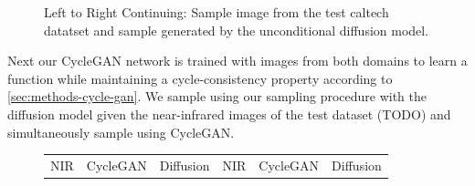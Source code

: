 \begin{figure}[htp!]
\begin{tabularx}{\textwidth}{>{\centering\arraybackslash}X >{\centering\arraybackslash}X >{\centering\arraybackslash}X >{\centering\arraybackslash}X >{\centering\arraybackslash}X >{\centering\arraybackslash}X}
    \end{tabularx}
    \caption{
        Left to Right Continuing: Sample image from the test caltech datatset \parencite{caltech} and sample generated by the unconditional diffusion model.
    }
    \label{fig:qualitative-evaluation-unconditional-sampling-caltech}
\end{figure}

Next our CycleGAN network is trained with images from both domains to learn a function while maintaining a cycle-consistency property according to \autoref{sec:methods-cycle-gan}.
We sample using our sampling procedure with the diffusion model given the near-infrared images of the test dataset (TODO) and simultaneously
sample using CycleGAN.

\begin{figure}[htp!]
    \centering
    \begin{tabularx}{\textwidth}{>{\centering\arraybackslash}X >{\centering\arraybackslash}X >{\centering\arraybackslash}X >{\centering\arraybackslash}X >{\centering\arraybackslash}X >{\centering\arraybackslash}X}
        NIR                                                                                                            & CycleGAN                                                                                                                 & Diffusion                                                                                                            & NIR                                                                                                            & CycleGAN                                                                                                                 & Diffusion                                                                                                            \\

\end{tabularx}
\end{figure}
